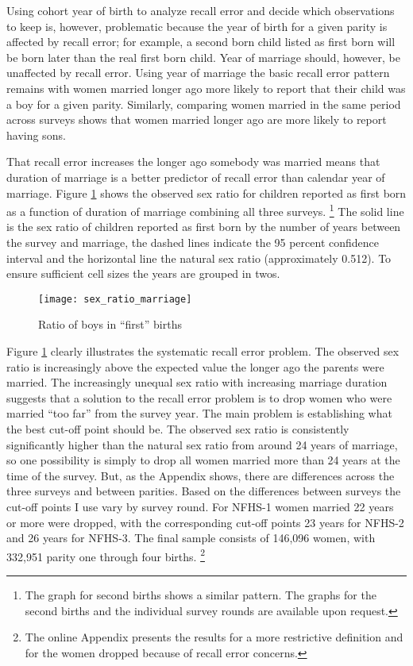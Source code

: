 \documentclass[12pt,letterpaper]{article}
\begin{document}
Using cohort year of birth to analyze recall error and decide which observations
to keep is, however, problematic because the year of birth for a given parity is affected 
by recall error; for example, a second born child listed as first born will be 
born later than the real first born child.
Year of marriage should, however, be unaffected by recall error.
Using year of marriage the basic recall error pattern remains with women married longer 
ago more likely to report that their child was a boy for a given parity.
Similarly, comparing women married in the same period across surveys shows
that women married longer ago are more likely to report having sons.

That recall error increases the longer ago somebody was married means
that duration of marriage is a better predictor of recall error than calendar year of 
marriage.
Figure \ref{fig:sexRatioMarriage} shows the observed sex ratio for children 
reported as first born as a function of duration of marriage combining all three surveys.%
\footnote{
The graph for second births shows a similar pattern.
The graphs for the second births and the individual survey rounds are available upon request.
}
The solid line is the sex ratio of children reported 
as first born by the number of years between the survey and marriage, 
the dashed lines indicate the 95 percent confidence interval 
and the horizontal line the natural sex ratio (approximately 0.512).
To ensure sufficient cell sizes the years are grouped in twos.

\begin{figure}[htp]%
\centering
\texttt{[image: sex\_ratio\_marriage]}
\caption{Ratio of boys in ``first'' births}
\label{fig:sexRatioMarriage}
\end{figure}


Figure \ref{fig:sexRatioMarriage} clearly illustrates the systematic recall error
problem.
The observed sex ratio is increasingly above the expected value the
longer ago the parents were married.
The increasingly unequal sex ratio with increasing marriage duration suggests that
a solution to the recall error problem is to drop women who were married ``too far'' from 
the survey year.
The main problem is establishing what the best cut-off point should be.
The observed sex ratio is consistently significantly higher than the natural sex ratio 
from around 24 years of marriage, so one possibility is simply to drop all women married 
more than 24 years at the time of the survey.
But, as the Appendix shows, there are differences across the three surveys and between 
parities.
Based on the differences between surveys the cut-off points I use vary by survey round.
For NFHS-1 women married 22 years or more were dropped, with the corresponding cut-off 
points 23 years for NFHS-2  and 26 years for NFHS-3.
The final sample consists of 146,096 women, with 332,951 parity one through four births.%
\footnote{
The online Appendix presents the results for a more restrictive definition and for the
women dropped because of recall error concerns.
}
\end{document}

